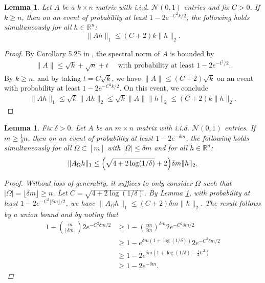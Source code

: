 \documentclass[12pt]{article}
\newcommand{\1}{\mathbbm{1}}
\newcommand{\floor}[1]{\lfloor #1 \rfloor}
\newcommand{\R}{\mathbb{R}}
\newtheorem{lemma}[theorem]{Lemma}
\begin{document}
\begin{lemma} \label{lem:aiho-concentration-k}
Let $A$ be a $k \times n$ matrix with i.i.d. $\mathcal{N}(0,1)$ entries and fix $C>0$.  If $k \geq n$, then on an event of probability at least $1 - 2 e^{- C^2 k /2}$, the following holds simultaneously for all $h \in \R^n$:
$$
\| A h\|_1 \leq (C+2) k \| h\|_2.
$$
\end{lemma}
\begin{proof}
 By Corollary 5.25 in \cite{V2012}, the spectral norm of $A$ is bounded by 
\begin{align*}
\| A \| \leq \sqrt{k} + \sqrt{n} + t \quad \text{ with probability at least } 1 - 2 e^{-t^2/2}.
\end{align*}
By $k \geq n$, and by taking $t  = C\sqrt{k}$, we have $\| A \| \leq (C+2) \sqrt{k}$ on an event with probability at least $1 - 2 e^{-C^2 k / 2}$. 
On this event, we conclude
\begin{align*}
\|A h\|_1 \leq \sqrt{k} \|Ah\|_2 \leq \sqrt{k} \|A\| \|h\|_2 \leq (C+2) k \|h\|_2.
\end{align*}
\end{proof}



\begin{lemma} \label{lem:aiho-concentration-uniformomega}
Fix $\delta >0$.  Let $A$ be an $m \times n$ matrix with i.i.d. $\mathcal{N}(0,1)$ entries.  If $m \geq \frac{1}{\delta} n$, then on an event of probability at least $1 - 2 e^{-\delta m} $, the following holds simultaneously for all $\Omega \subset [m]$ with $|\Omega| \leq \delta m$ and for all $h \in \R^n$: 
$$
\| A_{\Omega} h\|_1 \leq \Bigl(\sqrt{4+2\log(1/\delta)}+2 \Bigr) \delta m \| h\|_2.
$$
\begin{proof}
Without loss of generality, it suffices to only consider $\Omega$ such that  $|\Omega| = \floor{\delta m} \geq n$. Let $C = \sqrt{4 + 2\log(1/\delta)}$. By Lemma \ref{lem:aiho-concentration-k}, with probability at least $1 - 2 e^{-C^2 \floor{\delta m}/2}$, we have $\| A_\Omega h\|_1 \leq (C+2)\delta m \|h\|_2.$  The result follows by a union bound and by noting that
\begin{align*}
1 - {m \choose \floor{\delta m}}  2 e^{-C^2 \delta m/2} & \geq  1 - \left( \frac{e m}{\delta m} \right ) ^{\delta m} 2 e^{-C^2 \delta m/2}\\
& \geq  1 - e^{\delta m(1 + \log(1/\delta))}2 e^{-C^2 \delta m/2}\\
& \geq  1 - 2 e^{ \delta m( 1 + \log(1/\delta) -\frac{1}{2}C^2)}\\
& \geq  1 - 2 e^{ -\delta m}.
\end{align*}
\end{proof}

\end{lemma}
\end{document}
